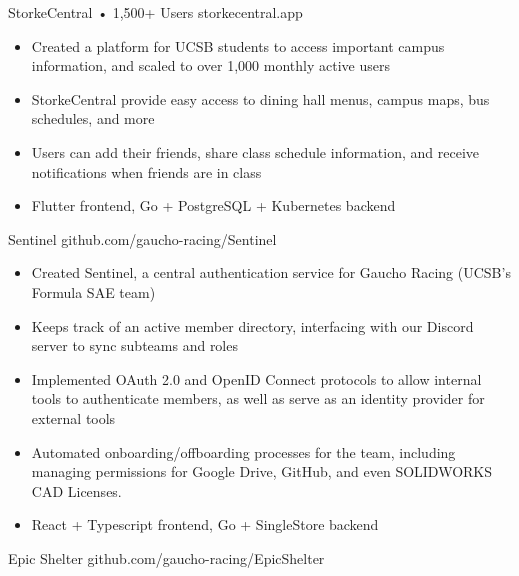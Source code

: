 \documentclass[9pt]{developercv} %
\begin{document}
\begin{entrylist}
    \entry
		{}
		{StorkeCentral • 1,500+ Users}
		{storkecentral.app}
        {\vspace{-8pt}
        \begin{itemize}[noitemsep,topsep=0pt,parsep=0pt,partopsep=0pt, leftmargin=10pt]
            \item Created a platform for UCSB students to access important campus information, and scaled to over 1,000 monthly active users
            \item StorkeCentral provide easy access to dining hall menus, campus maps, bus schedules, and more
            \item Users can add their friends, share class schedule information, and receive notifications when friends are in class
            \item Flutter frontend, Go + PostgreSQL + Kubernetes backend
        \end{itemize}}
	\entry
		{}
		{Sentinel}
		{github.com/gaucho-racing/Sentinel}
		{\vspace{-8pt}
        \begin{itemize}[noitemsep,topsep=0pt,parsep=0pt,partopsep=0pt, leftmargin=10pt]
            \item Created Sentinel, a central authentication service for Gaucho Racing (UCSB's Formula SAE team)
            \item Keeps track of an active member directory, interfacing with our Discord server to sync subteams and roles
            \item Implemented OAuth 2.0 and OpenID Connect protocols to allow internal tools to authenticate members, as well as serve as an identity provider for external tools
            \item Automated onboarding/offboarding processes for the team, including managing permissions for Google Drive, GitHub, and even SOLIDWORKS CAD Licenses.
            \item React + Typescript frontend, Go + SingleStore backend
        \end{itemize}}
    \entry
		{}
		{Epic Shelter}
		{github.com/gaucho-racing/EpicShelter}
		{\vspace{-8pt}
        \begin{itemize}[noitemsep,topsep=0pt,parsep=0pt,partopsep=0pt, leftmargin=10pt]

\end{itemize}}
\end{entrylist}
\end{document}
